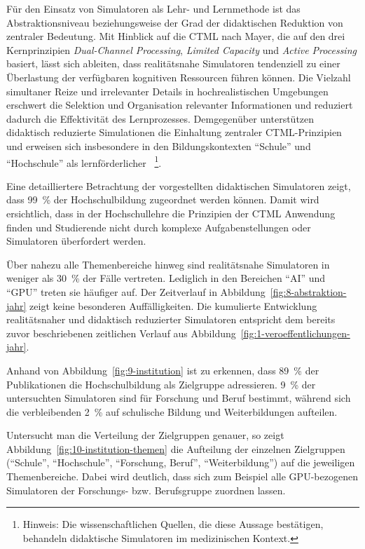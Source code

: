Für den Einsatz von Simulatoren als Lehr- und Lernmethode ist das Abstraktionsniveau beziehungsweise der Grad der didaktischen Reduktion von zentraler Bedeutung. Mit Hinblick auf die \ac{CTML} nach Mayer, die auf den drei Kernprinzipien \textit{Dual-Channel Processing}, \textit{Limited Capacity} und \textit{Active Processing} basiert, lässt sich ableiten, dass realitätsnahe Simulatoren tendenziell zu einer Überlastung der verfügbaren kognitiven Ressourcen führen können. Die Vielzahl simultaner Reize und irrelevanter Details in hochrealistischen Umgebungen erschwert die Selektion und Organisation relevanter Informationen und reduziert dadurch die Effektivität des Lernprozesses. Demgegenüber unterstützen didaktisch reduzierte Simulationen die Einhaltung zentraler \ac{CTML}-Prinzipien und erweisen sich insbesondere in den Bildungskontexten \enquote{Schule} und \enquote{Hochschule} als lernförderlicher \parencites[S.~169]{tremblay_task_2023}[S.~955]{haji_thrive_2016}[S.~360]{reedy_using_2015}~\footnote{Hinweis: Die wissenschaftlichen Quellen, die diese Aussage bestätigen, behandeln didaktische Simulatoren im medizinischen Kontext.}.

Eine detailliertere Betrachtung der vorgestellten didaktischen Simulatoren zeigt, dass 99~\% der Hochschulbildung zugeordnet werden können. Damit wird ersichtlich, dass in der Hochschullehre die Prinzipien der \ac{CTML} Anwendung finden und Studierende nicht durch komplexe Aufgabenstellungen oder Simulatoren überfordert werden.

Über nahezu alle Themenbereiche hinweg sind realitätsnahe Simulatoren in weniger als 30~\% der Fälle vertreten. Lediglich in den Bereichen \enquote{AI} und \enquote{GPU} treten sie häufiger auf. Der Zeitverlauf in Abbildung~\ref{fig:8-abstraktion-jahr} zeigt keine besonderen Auffälligkeiten. Die kumulierte Entwicklung realitätsnaher und didaktisch reduzierter Simulatoren entspricht dem bereits zuvor beschriebenen zeitlichen Verlauf aus Abbildung~\ref{fig:1-veroeffentlichungen-jahr}.

Anhand von Abbildung~\ref{fig:9-institution} ist zu erkennen, dass 89~\% der Publikationen die Hochschulbildung als Zielgruppe adressieren. 9~\% der untersuchten Simulatoren sind für Forschung und Beruf bestimmt, während sich die verbleibenden 2~\% auf schulische Bildung und Weiterbildungen aufteilen.

Untersucht man die Verteilung der Zielgruppen genauer, so zeigt Abbildung~\ref{fig:10-institution-themen} die Aufteilung der einzelnen Zielgruppen (\enquote{Schule}, \enquote{Hochschule}, \enquote{Forschung, Beruf}, \enquote{Weiterbildung}) auf die jeweiligen Themenbereiche. Dabei wird deutlich, dass sich zum Beispiel alle GPU-bezogenen Simulatoren der Forschungs- bzw. Berufsgruppe zuordnen lassen.

